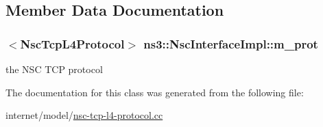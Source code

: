 \subsection{Member Data Documentation}
\subsubsection[{\texorpdfstring{m\+\_\+prot}{m_prot}}]{$<${\bf Nsc\+Tcp\+L4\+Protocol}$>$ ns3\+::\+Nsc\+Interface\+Impl\+::m\+\_\+prot\hspace{0.3cm}{\ttfamily [private]}}\hypertarget{classns3_1_1NscInterfaceImpl_a620240e0dedefe3d6c151c4eed31b5a9}{}\label{classns3_1_1NscInterfaceImpl_a620240e0dedefe3d6c151c4eed31b5a9}


the N\+SC T\+CP protocol 



The documentation for this class was generated from the following file\+:\begin{DoxyCompactItemize}
\item 
internet/model/\hyperlink{nsc-tcp-l4-protocol_8cc}{nsc-\/tcp-\/l4-\/protocol.\+cc}\end{DoxyCompactItemize}

